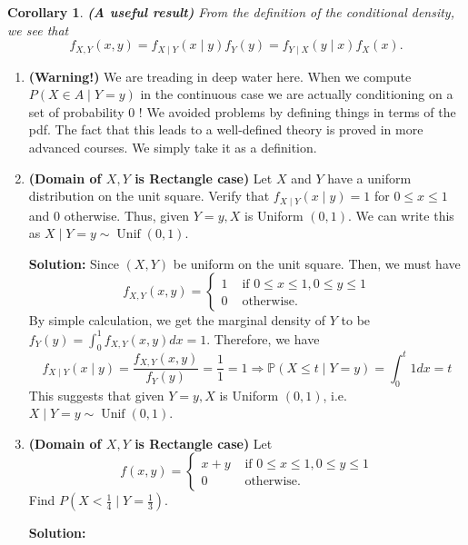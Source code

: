\documentclass[13pt]{article}
\newtheorem{corollary}[theorem]{Corollary}
\theoremstyle{definition}
\newenvironment{solution}
{\color{C2}\begin{framed}\begingroup\textbf{Solution:} }
  {\endgroup\end{framed}}
\theoremstyle{remark}
\newenvironment{remark}
  {\pushQED{\qed}\renewcommand{\qedsymbol}{$\triangle$}\remarkx}
  {\popQED\endremarkx}
\newcommand{\PP}{\mathbb{P}}
\begin{document}
\begin{corollary}\textbf{(A useful result)}
        From the definition of the conditional density, we see that 
        \[f_{X, Y}(x, y)=f_{X \mid Y}(x \mid y) f_{Y}(y)=f_{Y \mid X}(y \mid x) f_{X}(x).
        \]
\end{corollary}
\begin{remark}\hfill 
    \begin{enumerate}
        \item \textbf{(Warning!)} We are treading in deep water here. When we compute $P(X \in A \mid Y=y)$ in the continuous case we are actually conditioning on a set of probability 0 ! We avoided problems by defining things in terms of the pdf. The fact that this leads to a well-defined theory is proved in more advanced courses. We simply take it as a definition. 
        \item \textbf{(Domain of $X, Y$ is Rectangle case)} Let $X$ and $Y$ have a uniform distribution on the unit square. Verify that $f_{X \mid Y}(x \mid y)=1$ for $0 \leq x \leq 1$ and 0 otherwise. Thus, given $Y=y, X$ is Uniform $(0,1)$. We can write this as $X \mid Y=y \sim \operatorname{Unif}(0,1)$.
        \begin{solution}
            Since $(X, Y)$ be uniform on the unit square. Then, we must have  
            $$
            f_{X,Y}(x, y)= \begin{cases}1 & \text { if } 0 \leq x \leq 1,0 \leq y \leq 1 \\ 0 & \text { otherwise. }\end{cases}
            $$
            By simple calculation, we get the marginal density of $Y$ to be 
            $
            f_{Y}(y)= \int_0^1 f_{X,Y}(x, y) dx = 1
            $.
            Therefore, we have
            \[
            f_{X \mid Y}(x \mid y)=\frac{f_{X, Y}(x, y)}{f_{Y}(y)}=\frac{1}{1} =1 \Longrightarrow \PP(X\le t \mid Y=y) = \int_0^t 1 dx =t
            \]
            This suggests that given $Y=y, X$ is Uniform $(0,1)$, i.e. $X \mid Y=y \sim \operatorname{Unif}(0,1)$.
        \end{solution}  
        \item \textbf{(Domain of $X, Y$ is Rectangle case)} Let
$$
f(x, y)= \begin{cases}x+y & \text { if } 0 \leq x \leq 1,0 \leq y \leq 1 \\ 0 & \text { otherwise. }\end{cases}
$$
Find $P\left(X<\frac{1}{4} \mid Y=\frac{1}{3}\right)$.
\begin{solution}

\end{solution}
\end{enumerate}
\end{remark}
\end{document}
